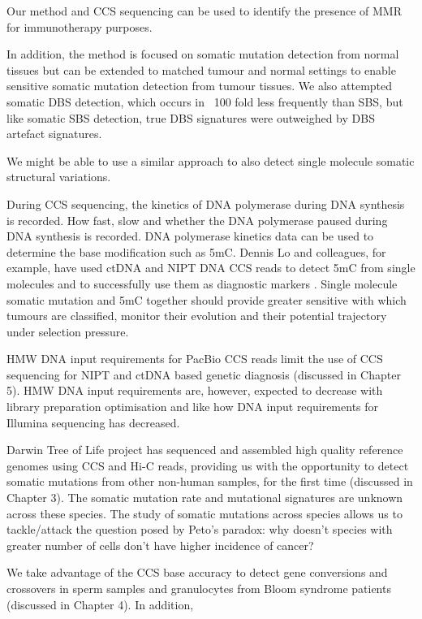 Our method and CCS sequencing can be used to identify the presence of MMR for immunotherapy purposes. 

In addition, the method is focused on somatic mutation detection from normal tissues but can be extended to matched tumour and normal settings to enable sensitive somatic mutation detection from tumour tissues. We also attempted somatic DBS detection, which occurs in ~100 fold less frequently than SBS, but like somatic SBS detection, true DBS signatures were outweighed by DBS artefact signatures. 

We might be able to use a similar approach to also detect single molecule somatic structural variations. 

During CCS sequencing, the kinetics of DNA polymerase during DNA synthesis is recorded. How fast, slow and whether the DNA polymerase paused during DNA synthesis is recorded. DNA polymerase kinetics data can be used to determine the base modification such as 5mC. Dennis Lo and colleagues, for example, have used ctDNA and NIPT DNA CCS reads to detect 5mC from single molecules and to successfully use them as diagnostic markers \cite{Vong2019-bi, Tse2021-or}. Single molecule somatic mutation and 5mC together should provide greater sensitive with which tumours are classified, monitor their evolution and their potential trajectory under selection pressure. 

HMW DNA input requirements for PacBio CCS reads limit the use of CCS sequencing for NIPT and ctDNA based genetic diagnosis (discussed in Chapter 5). HMW DNA input requirements are, however, expected to decrease with library preparation optimisation and like how DNA input requirements for Illumina sequencing has decreased. 

Darwin Tree of Life project has sequenced and assembled high quality reference genomes using CCS and Hi-C reads, providing us with the opportunity to detect somatic mutations from other non-human samples, for the first time (discussed in Chapter 3). The somatic mutation rate and mutational signatures are unknown across these species. The study of somatic mutations across species allows us to tackle/attack the question posed by Peto's paradox: why doesn't species with greater number of cells don't have higher incidence of cancer?

We take advantage of the CCS base accuracy to detect gene conversions and crossovers in sperm samples and granulocytes from Bloom syndrome patients (discussed in Chapter 4). In addition,

